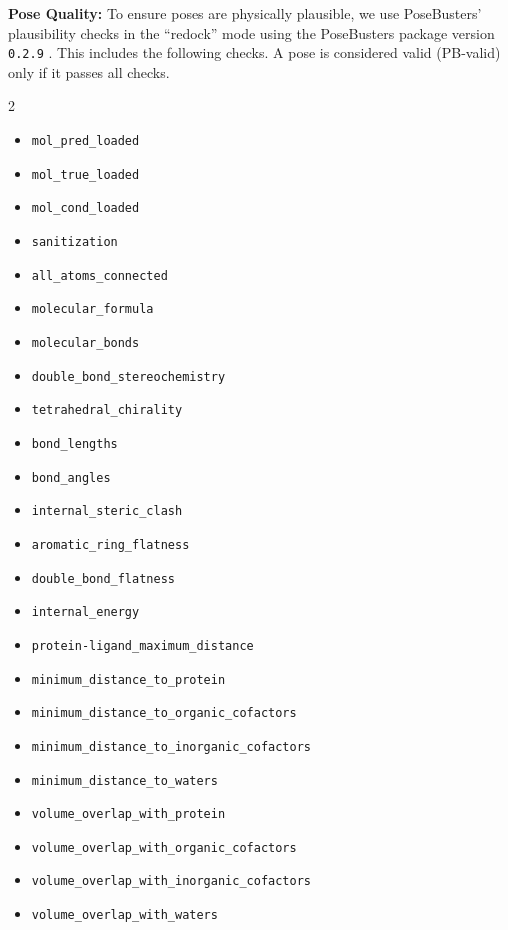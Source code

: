 \documentclass[11pt, letterpaper, onecolumn]{tau-class/tau}
\begin{document}
\textbf{Pose Quality:}
To ensure poses are physically plausible, we use PoseBusters' plausibility checks in the ``redock'' mode using the PoseBusters package version \texttt{0.2.9} \cite{buttenschoen2024posebusters}. This includes the following checks. A pose is considered valid (PB-valid) only if it passes all checks.
\begin{multicols}{2} %
\small
\begin{itemize}
    \item \texttt{mol\_pred\_loaded}
    \item \texttt{mol\_true\_loaded}
    \item \texttt{mol\_cond\_loaded}
    \item \texttt{sanitization}
    \item \texttt{all\_atoms\_connected}
    \item \texttt{molecular\_formula}
    \item \texttt{molecular\_bonds}
    \item \texttt{double\_bond\_stereochemistry}
    \item \texttt{tetrahedral\_chirality}
    \item \texttt{bond\_lengths}
    \item \texttt{bond\_angles}
    \item \texttt{internal\_steric\_clash}
    \item \texttt{aromatic\_ring\_flatness}
    \item \texttt{double\_bond\_flatness}
    \item \texttt{internal\_energy}
    \item \texttt{protein-ligand\_maximum\_distance}
    \item \texttt{minimum\_distance\_to\_protein}
    \item \texttt{minimum\_distance\_to\_organic\_cofactors}
    \item \texttt{minimum\_distance\_to\_inorganic\_cofactors}
    \item \texttt{minimum\_distance\_to\_waters}
    \item \texttt{volume\_overlap\_with\_protein}
    \item \texttt{volume\_overlap\_with\_organic\_cofactors}
    \item \texttt{volume\_overlap\_with\_inorganic\_cofactors}
    \item \texttt{volume\_overlap\_with\_waters}
\end{itemize}
\end{multicols}
\end{document}
